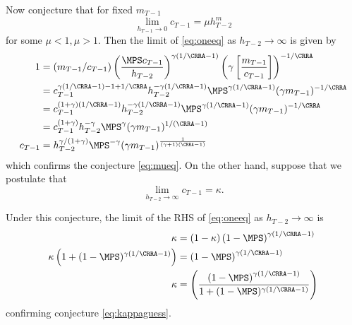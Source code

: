 \documentclass[\econtexRoot/SolvingMicroDSOPs]{subfiles}
\begin{document}
Now conjecture that for fixed $m_{T-1}$
\begin{equation}
  \lim_{h_{T-1} \rightarrow 0} c_{T-1} = \mu h_{T-2}^{m}
  \label{eq:mueq}
\end{equation}
for some $\mu<1, \mu>1$.  Then the limit of \eqref{eq:oneeq} as $h_{T-2}
\rightarrow \infty$ is given by
\begin{equation*}\begin{gathered}\begin{aligned}
  1  & = (m_{T-1}/{c}_{T-1})\left(\frac{\MPS
       c_{T-1}}{h_{T-2}}\right)^{\gamma(1/\CRRA-1)}\left(\gamma
       \left[\frac{{m}_{T-1}}{{c}_{T-1}}\right]\right)^{-1/\CRRA}
  \\
     & =                 c_{T-1}^{\gamma(1/\CRRA-1)-1+1/\CRRA}h_{T-2}^{-\gamma(1/\CRRA-1)}\MPS^{\gamma(1/\CRRA-1)}(\gamma m_{T-1})^{-1/\CRRA}
  \\
     & =                 c_{T-1}^{(1+\gamma)(1/\CRRA-1)}h_{T-2}^{-\gamma(1/\CRRA-1)}\MPS^{\gamma(1/\CRRA-1)}(\gamma m_{T-1})^{-1/\CRRA}
  \\
     & =                 c_{T-1}^{(1+\gamma)}h_{T-2}^{-\gamma}\MPS^{\gamma}(\gamma m_{T-1})^{1/(\CRRA-1)}
  \\ c_{T-1}    & = h_{T-2}^{\gamma/(1+\gamma)}\MPS^{-\gamma}(\gamma
                    m_{T-1})^{\frac{1}{(\gamma+1)(\CRRA-1)}}
\end{aligned}\end{gathered}\end{equation*}
which confirms the conjecture \eqref{eq:mueq}.  On the other hand,
suppose that we postulate that
\begin{equation}
  \lim_{h_{T-2} \rightarrow \infty} c_{T-1} = \kappa.
  \label{eq:kappaguess}
\end{equation}

Under this conjecture, the limit of the RHS of \eqref{eq:oneeq} as
$h_{T-2} \rightarrow \infty$ is
\begin{equation*}\begin{gathered}\begin{aligned}
  \kappa
  & =                  (1-\kappa)\left(1-\MPS\right)^{\gamma(1/\CRRA-1)}
  \\      \kappa\left(1+(1-\MPS)^{\gamma(1/\CRRA-1)}\right)  & = \left(1-\MPS\right)^{\gamma(1/\CRRA-1)}
  \\      \kappa
  & =                          \left(\frac{\left(1-\MPS\right)^{\gamma(1/\CRRA-1)}}
    {1+(1-\MPS)^{\gamma(1/\CRRA-1)}}\right)
\end{aligned}\end{gathered}\end{equation*}
confirming conjecture \eqref{eq:kappaguess}.
\end{document}
